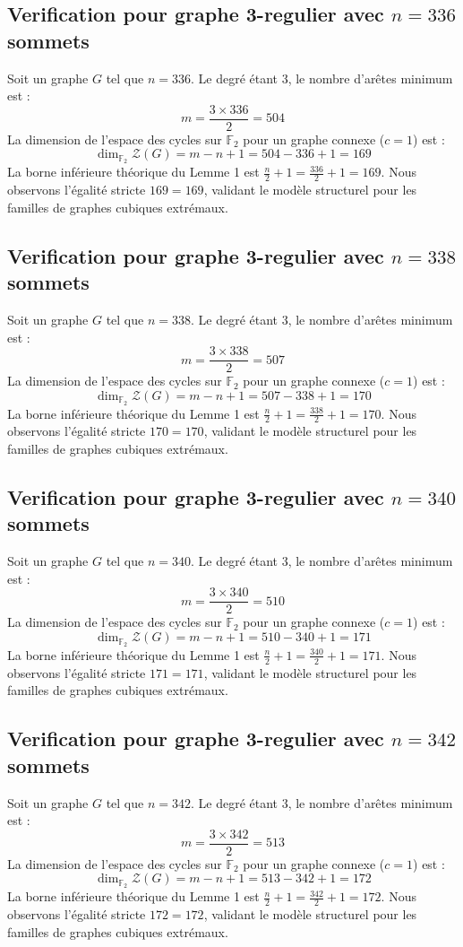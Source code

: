 \documentclass[11pt,a4paper]{article}
\begin{document}
\subsection{Verification pour graphe 3-regulier avec $n=336$ sommets}
Soit un graphe $G$ tel que $n = 336$. Le degré étant 3, le nombre d'arêtes minimum est :
$$ m = \frac{3 \times 336}{2} = 504 $$
La dimension de l'espace des cycles sur $\mathbb{F}_2$ pour un graphe connexe ($c=1$) est :
$$ \dim_{\mathbb{F}_2} \mathcal{Z}(G) = m - n + 1 = 504 - 336 + 1 = 169 $$
La borne inférieure théorique du Lemme 1 est $\frac{n}{2} + 1 = \frac{336}{2} + 1 = 169$.
Nous observons l'égalité stricte $169 = 169$, validant le modèle structurel pour les familles de graphes cubiques extrémaux.

\subsection{Verification pour graphe 3-regulier avec $n=338$ sommets}
Soit un graphe $G$ tel que $n = 338$. Le degré étant 3, le nombre d'arêtes minimum est :
$$ m = \frac{3 \times 338}{2} = 507 $$
La dimension de l'espace des cycles sur $\mathbb{F}_2$ pour un graphe connexe ($c=1$) est :
$$ \dim_{\mathbb{F}_2} \mathcal{Z}(G) = m - n + 1 = 507 - 338 + 1 = 170 $$
La borne inférieure théorique du Lemme 1 est $\frac{n}{2} + 1 = \frac{338}{2} + 1 = 170$.
Nous observons l'égalité stricte $170 = 170$, validant le modèle structurel pour les familles de graphes cubiques extrémaux.

\subsection{Verification pour graphe 3-regulier avec $n=340$ sommets}
Soit un graphe $G$ tel que $n = 340$. Le degré étant 3, le nombre d'arêtes minimum est :
$$ m = \frac{3 \times 340}{2} = 510 $$
La dimension de l'espace des cycles sur $\mathbb{F}_2$ pour un graphe connexe ($c=1$) est :
$$ \dim_{\mathbb{F}_2} \mathcal{Z}(G) = m - n + 1 = 510 - 340 + 1 = 171 $$
La borne inférieure théorique du Lemme 1 est $\frac{n}{2} + 1 = \frac{340}{2} + 1 = 171$.
Nous observons l'égalité stricte $171 = 171$, validant le modèle structurel pour les familles de graphes cubiques extrémaux.

\subsection{Verification pour graphe 3-regulier avec $n=342$ sommets}
Soit un graphe $G$ tel que $n = 342$. Le degré étant 3, le nombre d'arêtes minimum est :
$$ m = \frac{3 \times 342}{2} = 513 $$
La dimension de l'espace des cycles sur $\mathbb{F}_2$ pour un graphe connexe ($c=1$) est :
$$ \dim_{\mathbb{F}_2} \mathcal{Z}(G) = m - n + 1 = 513 - 342 + 1 = 172 $$
La borne inférieure théorique du Lemme 1 est $\frac{n}{2} + 1 = \frac{342}{2} + 1 = 172$.
Nous observons l'égalité stricte $172 = 172$, validant le modèle structurel pour les familles de graphes cubiques extrémaux.
\end{document}
